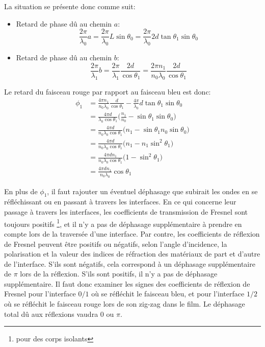 La situation se présente donc comme suit:
\begin{itemize}
    \item Retard de phase dû au chemin $a$:
    $$ \frac{2\pi}{\lambda_0}a=\frac{2\pi}{\lambda_0}L\sin \theta_0=\frac{2\pi}{\lambda_0}2d \tan \theta_1 \sin \theta_0$$
    \item Retard de phase dû au chemin $b$:
    $$\frac{2\pi}{\lambda_1}b=\frac{2\pi}{\lambda_1}\frac{2d}{\cos \theta_1}=\frac{2\pi n_1}{n_0\lambda_0}\frac{2d}{\cos \theta_1}$$
\end{itemize}
Le retard du faisceau rouge par rapport au faisceau bleu est donc:
\begin{align*}
\phi_1 & = \frac{4\pi n_1}{n_0\lambda_0}\frac{d}{\cos \theta_1}-\frac{4\pi}{\lambda_0}d \tan \theta_1 \sin \theta_0 \\
& = \frac{4\pi d}{\lambda_0 \cos \theta_1}\Big (\frac{n_1}{n_0}-\sin \theta_1 \sin \theta_0\Big ) \\
& = \frac{4\pi d}{n_0\lambda_0 \cos \theta_1}\big (n_1-\sin \theta_1 n_0\sin \theta_0\big )\\
& = \frac{4\pi d}{n_0\lambda_0 \cos \theta_1}\big (n_1- n_1\sin^2 \theta_1\big )\\
& = \frac{4\pi dn_1}{n_0\lambda_0 \cos \theta_1}\big (1- \sin^2 \theta_1\big )\\
& = \frac{4\pi dn_1}{n_0\lambda_0 }\cos \theta_1
\end{align*}

En plus de $\phi_1$, il faut rajouter un éventuel déphasage que subirait les ondes en se réfléchissant ou en passant à travers les interfaces. En ce qui concerne leur passage à travers les interfaces, les coefficients de transmission de Fresnel sont toujours positifs \footnote{pour des corps isolants}, et il n'y a pas de déphasage supplémentaire à prendre en compte lors de la traversée d'une interface. Par contre, les coefficients de réflexion de Fresnel peuvent être positifs ou négatifs, selon l'angle d'incidence, la polarisation et la valeur des indices de réfraction des matériaux de part et d'autre de l'interface. S'ils sont négatifs, cela correspond à un déphasage supplémentaire de $\pi$ lors de la réflexion. S'ils sont positifs, il n'y a pas de déphasage supplémentaire. Il faut donc examiner les signes des coefficients de réflexion de Fresnel pour l'interface $0/1$ où se réfléchit le faisceau bleu, et pour l'interface $1/2$ où se réfléchit le faisceau rouge lors de son zig-zag dans le film. Le déphasage total dû aux réflexions vaudra $0$ ou $\pi$.\\


